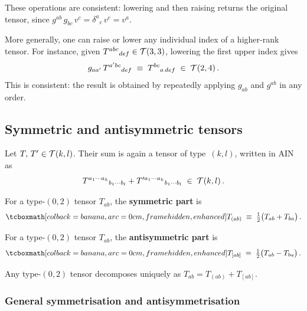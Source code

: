 \begin{remark}
  These operations are consistent:
  lowering and then raising returns the original tensor, since
  $g^{ab}\,g_{bc}\,v^c = \delta^a{}_c\,v^c = v^a$.
\end{remark}

\noindent
More generally, one can raise or lower any individual index of
a higher-rank tensor.  For instance, given
$T^{abc}{}_{def}\in\mathcal{T}(3,3)$, lowering the first upper
index gives
\begin{equation}\label{eq:general-lowering}
  g_{aa'}\, T^{a'bc}{}_{def}
  \;\equiv\; T^{bc}{}_{a\,def}
  \;\in\; \mathcal{T}(2,4)\,.
\end{equation}
This is consistent: the result is obtained by repeatedly
applying $g_{ab}$ and $g^{ab}$ in any order.

\subsection{Symmetric and antisymmetric tensors}%
\label{sec:symmetrisation}

Let $T,\, T'\in\mathcal{T}(k,l)$.  Their sum is again a tensor of
type~$(k,l)$, written in AIN as
\[
  T^{a_1\cdots a_k}{}_{b_1\cdots b_l}
  + T'^{a_1\cdots a_k}{}_{b_1\cdots b_l}
  \;\in\; \mathcal{T}(k,l)\,.
\]

\begin{definition}[Symmetrisation]\label{def:symmetrisation}
  For a type-$(0,2)$ tensor $T_{ab}$, the
  \textbf{symmetric part} is
  \begin{equation}\label{eq:sym-2}
    \eqbox{T_{(ab)} \;\equiv\; \tfrac{1}{2}\bigl(T_{ab} + T_{ba}\bigr)}\,.
  \end{equation}
\end{definition}

\begin{definition}[Antisymmetrisation]\label{def:antisymmetrisation}
  For a type-$(0,2)$ tensor $T_{ab}$, the
  \textbf{antisymmetric part} is
  \begin{equation}\label{eq:antisym-2}
    \eqbox{T_{[ab]} \;\equiv\; \tfrac{1}{2}\bigl(T_{ab} - T_{ba}\bigr)}\,.
  \end{equation}
\end{definition}

\noindent
Any type-$(0,2)$ tensor decomposes uniquely as
$T_{ab} = T_{(ab)} + T_{[ab]}$.

\subsubsection{General symmetrisation and antisymmetrisation}%
\label{sec:general-sym}

